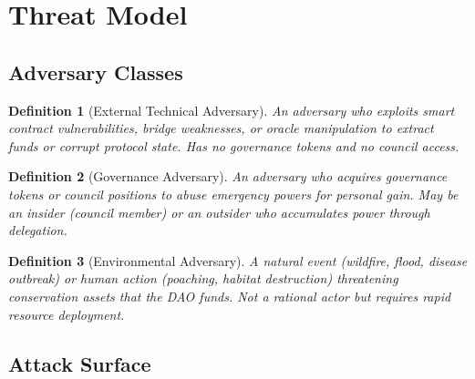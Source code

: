 \documentclass[11pt,letterpaper]{article}
\newtheorem{definition}{Definition}[section]
\begin{document}
\section{Threat Model}
\label{sec:threat}

\subsection{Adversary Classes}

\begin{definition}[External Technical Adversary]
An adversary who exploits smart contract vulnerabilities, bridge weaknesses, or oracle manipulation to extract funds or corrupt protocol state. Has no governance tokens and no council access.
\end{definition}

\begin{definition}[Governance Adversary]
An adversary who acquires governance tokens or council positions to abuse emergency powers for personal gain. May be an insider (council member) or an outsider who accumulates power through delegation.
\end{definition}

\begin{definition}[Environmental Adversary]
A natural event (wildfire, flood, disease outbreak) or human action (poaching, habitat destruction) threatening conservation assets that the DAO funds. Not a rational actor but requires rapid resource deployment.
\end{definition}

\subsection{Attack Surface}
\end{document}
